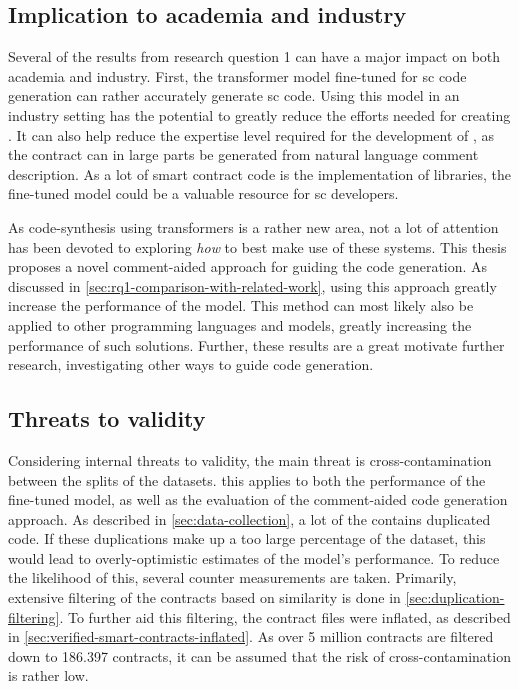 \subsection{Implication to academia and industry}
\label{sec:rq1-implication-to-academia-and-industry}
Several of the results from research question 1 can have a major impact on both academia and industry. First, the transformer model fine-tuned for \acrshort{sc} code generation can rather accurately generate \acrshort{sc} code. Using this model in an industry setting has the potential to greatly reduce the efforts needed for creating . It can also help reduce the expertise level required for the development of , as the contract can in large parts be generated from natural language comment description. As a lot of smart contract code is the implementation of libraries, the fine-tuned model could be a valuable resource for \acrshort{sc} developers.

As code-synthesis using transformers is a rather new area, not a lot of attention has been devoted to exploring \textit{how} to best make use of these systems. This thesis proposes a novel comment-aided approach for guiding the code generation. As discussed in \cref{sec:rq1-comparison-with-related-work}, using this approach greatly increase the performance of the model. This method can most likely also be applied to other programming languages and models,  greatly increasing the performance of such solutions. Further, these results are a great motivate further research, investigating other ways to guide code generation.

\subsection{Threats to validity}
\label{sec:rq1-threats-to-validity}

Considering internal threats to validity, the main threat is cross-contamination between the splits of the datasets. this applies to both the performance of the fine-tuned model, as well as the evaluation of the comment-aided code generation approach. As described in \cref{sec:data-collection}, a lot of the  contains duplicated code. If these duplications make up a too large percentage of the dataset, this would lead to overly-optimistic estimates of the model's performance. To reduce the likelihood of this, several counter measurements are taken. Primarily, extensive filtering of the contracts based on similarity is done in \cref{sec:duplication-filtering}. To further aid this filtering, the contract files were inflated, as described in \cref{sec:verified-smart-contracts-inflated}. As over 5 million contracts are filtered down to 186.397 contracts, it can be assumed that the risk of cross-contamination is rather low.

